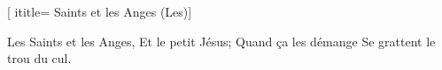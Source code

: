  [
ititle= {Saints et les Anges (Les)}]

\beginverse
Les Saints et les Anges,
Et le petit Jésus;
Quand ça les démange
Se grattent le trou du cul.
\endverse

\endsong